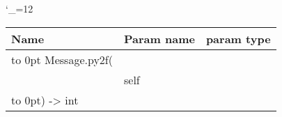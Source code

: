 \begingroup \catcode`\_=12 \tt
\begin{tabular}{lll}
\toprule
\textrm{Name}&\textrm{Param name}&\textrm{param type}\\
\midrule
\hbox to 0pt {Message.py2f(\hss}\\
& self\\
\hbox to 0pt{) -> int\hss}\\
\bottomrule
\end{tabular}
\endgroup
